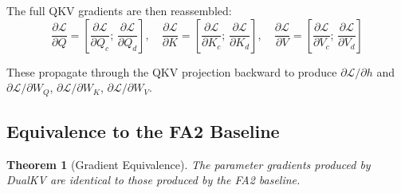 \documentclass{article}
\newtheorem{theorem}{Theorem}
\begin{document}
The full QKV gradients are then reassembled:
\begin{equation}
  \frac{\partial \mathcal{L}}{\partial Q} = \left[\frac{\partial \mathcal{L}}{\partial Q_c};\, \frac{\partial \mathcal{L}}{\partial Q_d}\right], \quad
  \frac{\partial \mathcal{L}}{\partial K} = \left[\frac{\partial \mathcal{L}}{\partial K_c};\, \frac{\partial \mathcal{L}}{\partial K_d}\right], \quad
  \frac{\partial \mathcal{L}}{\partial V} = \left[\frac{\partial \mathcal{L}}{\partial V_c};\, \frac{\partial \mathcal{L}}{\partial V_d}\right]
\end{equation}

These propagate through the QKV projection backward to produce $\partial \mathcal{L}/\partial h$ and $\partial \mathcal{L}/\partial W_Q$, $\partial \mathcal{L}/\partial W_K$, $\partial \mathcal{L}/\partial W_V$.

\subsection{Equivalence to the FA2 Baseline}
\label{sec:equiv-theorem}

\begin{theorem}[Gradient Equivalence]
The parameter gradients produced by DualKV are identical to those produced by the FA2 baseline.
\end{theorem}
\end{document}
